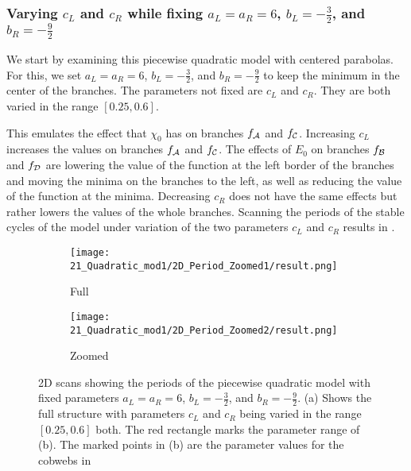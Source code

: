 \subsubsection{Varying $c_L$ and $c_R$ while fixing $a_L = a_R = 6$, $b_L = - \frac{3}{2}$, and $b_R = -\frac{9}{2}$}

We start by examining this piecewise quadratic model with centered parabolas.
For this, we set $a_L = a_R = 6$, $b_L = -\frac{3}{2}$, and $b_R = -\frac{9}{2}$ to keep the minimum in the center of the branches.
The parameters not fixed are $c_L$ and $c_R$.
They are both varied in the range $[0.25, 0.6]$.

This emulates the effect that $\chi_0$ has on branches $f_{\mathcal{A}}$ and $f_{\mathcal{C}}$.
Increasing $c_L$ increases the values on branches $f_{\mathcal{A}}$ and $f_{\mathcal{C}}$.
The effects of $E_0$ on branches $f_{\mathcal{B}}$ and $f_{\mathcal{D}}$ are lowering the value of the function at the left border of the branches and moving the minima on the branches to the left, as well as reducing the value of the function at the minima.
Decreasing $c_R$ does not have the same effects but rather lowers the values of the whole branches.
Scanning the periods of the stable cycles of the model under variation of the two parameters $c_L$ and $c_R$ results in .

\begin{figure}
	\centering
	\begin{subfigure}{0.4\textwidth}
		\centering
		\texttt{[image: 21\_Quadratic\_mod1/2D\_Period\_Zoomed1/result.png]}
		\caption{Full}
		\label{fig:setup.quad.even.period.full}
	\end{subfigure}
	\begin{subfigure}{0.4\textwidth}
		\centering
		\texttt{[image: 21\_Quadratic\_mod1/2D\_Period\_Zoomed2/result.png]}
		\caption{Zoomed}
		\label{fig:setup.quad.even.period.zoomed}
	\end{subfigure}
	\caption[2D scans showing periods of the even quadratic model]{
		2D scans showing the periods of the piecewise quadratic model with fixed parameters $a_L = a_R = 6$, $b_L = -\frac{3}{2}$, and $b_R = -\frac{9}{2}$.
		(a) Shows the full structure with parameters $c_L$ and $c_R$ being varied in the range $[0.25, 0.6]$ both.
		The red rectangle marks the parameter range of (b).
		The marked points in (b) are the parameter values for the cobwebs in 
	}
\end{figure}

